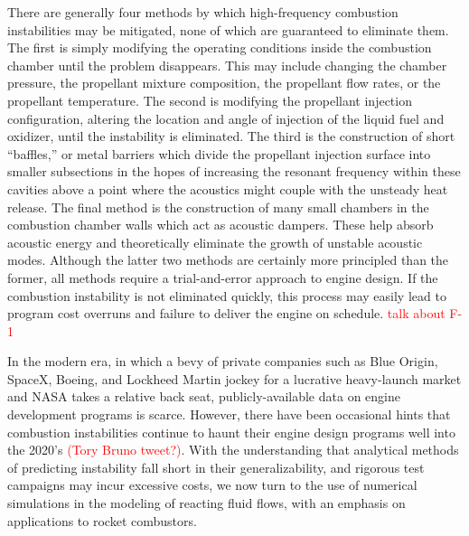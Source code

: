 There are generally four methods by which high-frequency combustion instabilities may be mitigated, none of which are guaranteed to eliminate them. The first is simply modifying the operating conditions inside the combustion chamber until the problem disappears. This may include changing the chamber pressure, the propellant mixture composition, the propellant flow rates, or the propellant temperature. The second is modifying the propellant injection configuration, altering the location and angle of injection of the liquid fuel and oxidizer, until the instability is eliminated. The third is the construction of short ``baffles,'' or metal barriers which divide the propellant injection surface into smaller subsections in the hopes of increasing the resonant frequency within these cavities above a point where the acoustics might couple with the unsteady heat release. The final method is the construction of many small chambers in the combustion chamber walls which act as acoustic dampers. These help absorb acoustic energy and theoretically eliminate the growth of unstable acoustic modes. Although the latter two methods are certainly more principled than the former, all methods require a trial-and-error approach to engine design. If the combustion instability is not eliminated quickly, this process may easily lead to program cost overruns and failure to deliver the engine on schedule. \textcolor{red}{talk about F-1}

In the modern era, in which a bevy of private companies such as Blue Origin, SpaceX, Boeing, and Lockheed Martin jockey for a lucrative heavy-launch market and NASA takes a relative back seat, publicly-available data on engine development programs is scarce. However, there have been occasional hints that combustion instabilities continue to haunt their engine design programs well into the 2020's \textcolor{red}{(Tory Bruno tweet?)}. With the understanding that analytical methods of predicting instability fall short in their generalizability, and rigorous test campaigns may incur excessive costs, we now turn to the use of numerical simulations in the modeling of reacting fluid flows, with an emphasis on applications to rocket combustors.

